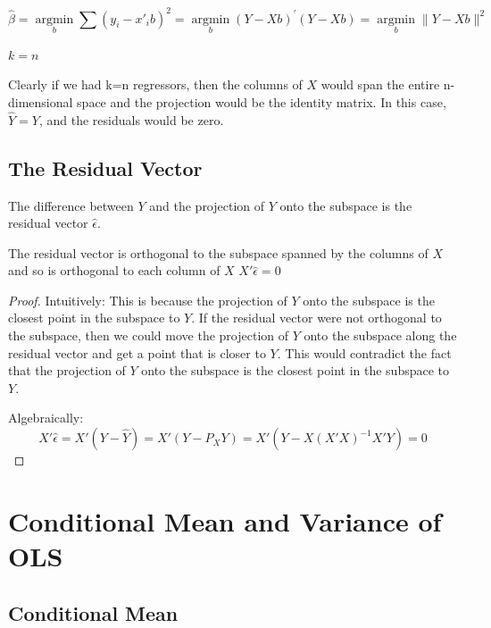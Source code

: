\documentclass[DIV=14,titlepage=false]{scrreprt}
\begin{document}
\[\hat{\beta} = \operatorname*{argmin}_{b} \sum(y_i-x'_ib)^2 = \operatorname*{argmin}_{b} (Y-Xb)^{'}(Y-Xb)=\operatorname*{argmin}_{b}\|Y-Xb\|^2\]

\begin{example}
  \(k=n\)

  Clearly if we had k=n regressors, then the columns of \(X\) would span the entire n-dimensional space and the projection would be the identity matrix. In this case, \(\hat{Y}=Y\), and the residuals would be zero.
\end{example}

\subsection{The Residual Vector}

The difference between \(Y\) and the projection of \(Y\) onto the subspace is the residual vector \(\hat{\epsilon}\). 

\vspace{5mm}

\begin{claim}
  The residual vector is orthogonal to the subspace spanned by the columns of \(X\) and so is orthogonal to each column of \(X\) \(X'\hat{\epsilon}=0\)
\end{claim}

\vspace{5mm}

\begin{proof}
  Intuitively:
  This is because the projection of \(Y\) onto the subspace is the closest point in the subspace to \(Y\). If the residual vector were not orthogonal to the subspace, then we could move the projection of \(Y\) onto the subspace along the residual vector and get a point that is closer to \(Y\). This would contradict the fact that the projection of \(Y\) onto the subspace is the closest point in the subspace to \(Y\).

  Algebraically:
  \[X'\hat{\epsilon}=X'(Y-\hat{Y})=X'(Y-P_XY)=X'(Y-X(X'X)^{-1}X'Y)=0\]

\end{proof}
 
\section{Conditional Mean and Variance of OLS}

\subsection{Conditional Mean}
\end{document}
